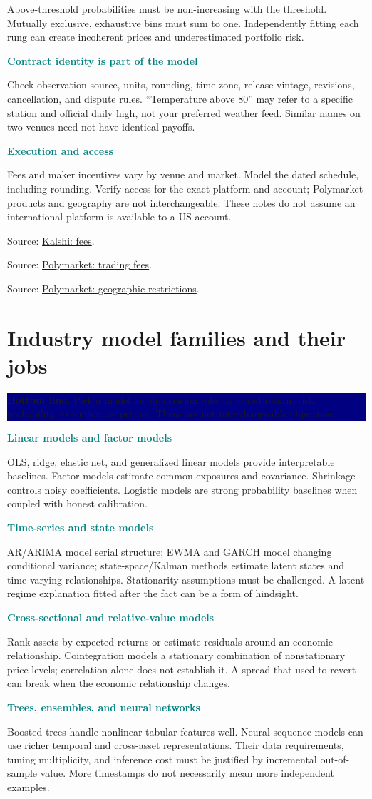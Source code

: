 \documentclass[10pt,letterpaper]{article}
\newcommand{\bl}[1]{\noindent\colorbox{navy}{\parbox{\dimexpr\linewidth-2\fboxsep}{\color{white}\textbf{Bottom line.} #1}}\par\medskip}
\newcommand{\topic}[2]{\clearpage\section{#1}\bl{#2}}
\newcommand{\sub}[1]{\par\textbf{\textcolor{teal}{#1}}\par}
\newcommand{\src}[2]{\par{\footnotesize Source: \href{#1}{#2}.}}
\begin{document}
Above-threshold probabilities must be non-increasing with the threshold. Mutually exclusive, exhaustive bins must sum to one. Independently fitting each rung can create incoherent prices and underestimated portfolio risk.
\sub{Contract identity is part of the model}
Check observation source, units, rounding, time zone, release vintage, revisions, cancellation, and dispute rules. ``Temperature above 80'' may refer to a specific station and official daily high, not your preferred weather feed. Similar names on two venues need not have identical payoffs.
\sub{Execution and access}
Fees and maker incentives vary by venue and market. Model the dated schedule, including rounding. Verify access for the exact platform and account; Polymarket products and geography are not interchangeable. These notes do not assume an international platform is available to a US account.
\src{https://help.kalshi.com/en/articles/13823805-fees}{Kalshi: fees}
\src{https://help.polymarket.com/en/articles/13364478-trading-fees}{Polymarket: trading fees}
\src{https://help.polymarket.com/en/articles/13364163-geographic-restrictions}{Polymarket: geographic restrictions}
\topic{Industry model families and their jobs}{Pick a model for its decision role: expected return, risk, probability, execution, or pricing. These are not interchangeable objectives.}
\sub{Linear models and factor models}
OLS, ridge, elastic net, and generalized linear models provide interpretable baselines. Factor models estimate common exposures and covariance. Shrinkage controls noisy coefficients. Logistic models are strong probability baselines when coupled with honest calibration.
\sub{Time-series and state models}
AR/ARIMA model serial structure; EWMA and GARCH model changing conditional variance; state-space/Kalman methods estimate latent states and time-varying relationships. Stationarity assumptions must be challenged. A latent regime explanation fitted after the fact can be a form of hindsight.
\sub{Cross-sectional and relative-value models}
Rank assets by expected returns or estimate residuals around an economic relationship. Cointegration models a stationary combination of nonstationary price levels; correlation alone does not establish it. A spread that used to revert can break when the economic relationship changes.
\sub{Trees, ensembles, and neural networks}
Boosted trees handle nonlinear tabular features well. Neural sequence models can use richer temporal and cross-asset representations. Their data requirements, tuning multiplicity, and inference cost must be justified by incremental out-of-sample value. More timestamps do not necessarily mean more independent examples.
\end{document}
